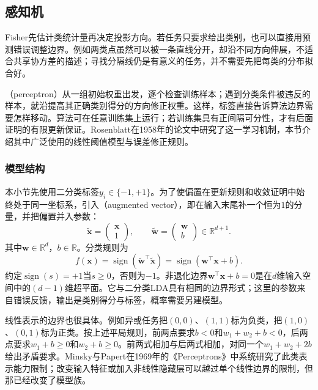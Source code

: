 \subsection{感知机}
\label{sec:classification-perceptron}

Fisher先估计类统计量再决定投影方向。若任务只要求给出类别，也可以直接用预测错误调整边界。例如两类点虽然可以被一条直线分开，却沿不同方向伸展，不适合共享协方差的描述；寻找分隔线仍是有意义的任务，并不需要先把每类的分布拟合好。

（perceptron）从一组初始权重出发，逐个检查训练样本；遇到分类条件被违反的样本，就沿提高其正确类别得分的方向修正权重。这样，标签直接告诉算法边界需要怎样移动。算法可在任意训练集上运行；若训练集具有正间隔可分性，才有后面证明的有限更新保证。Rosenblatt在1958年的论文中研究了这一学习机制，本节介绍其中广泛使用的线性阈值模型与误差修正规则。

\subsubsection{模型结构}
\label{sec:classification-perceptron-model}

本小节先使用二分类标签$y_i\in\{-1,+1\}$。为了使偏置在更新规则和收敛证明中始终处于同一坐标系，引入（augmented vector），即在输入末尾补一个恒为$1$的分量，并把偏置并入参数：
\begin{equation}
  \label{eq:classification-perceptron-augmented}
  \tilde{\bm{x}}=
    \begin{pmatrix}\bm{x}\\1\end{pmatrix},\qquad
  \tilde{\bm{w}}=
    \begin{pmatrix}\bm{w}\\b\end{pmatrix}
    \in\mathbb{R}^{d+1}.
\end{equation}
其中$\bm{w}\in\mathbb{R}^{d}$，$b\in\mathbb{R}$。分类规则为
\begin{equation}
  \label{eq:classification-perceptron-prediction}
  f(\bm{x})=\operatorname{sign}
    (\tilde{\bm{w}}^{\top}\tilde{\bm{x}})
    =\operatorname{sign}(\bm{w}^{\top}\bm{x}+b).
\end{equation}
约定$\operatorname{sign}(s)=+1$当$s\geq0$，否则为$-1$。非退化边界$\bm{w}^{\top}\bm{x}+b=0$是在$d$维输入空间中的$(d-1)$维超平面。它与二分类LDA具有相同的边界形式；这里的参数来自错误反馈，输出是类别得分与标签，概率需要另建模型。

线性表示的边界也很具体。例如异或任务把$(0,0)$、$(1,1)$标为负类，把$(1,0)$、$(0,1)$标为正类。按上述平局规则，前两点要求$b<0$和$w_1+w_2+b<0$，后两点要求$w_1+b\geq0$和$w_2+b\geq0$。前两式相加与后两式相加，对同一个$w_1+w_2+2b$给出矛盾要求。Minsky与Papert在1969年的《Perceptrons》中系统研究了此类表示能力限制；改变输入特征或加入非线性隐藏层可以越过单个线性边界的限制，但那已经改变了模型族。

